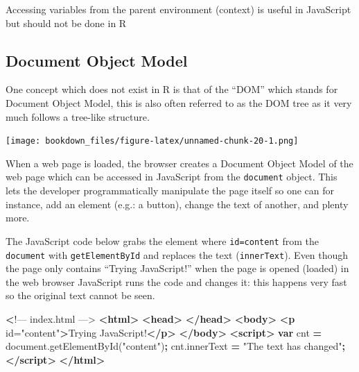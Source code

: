 \documentclass[
]{krantz}
\makeatletter
\newenvironment{Shaded}{\begin{snugshade}}{\end{snugshade}}
\newcommand{\AttributeTok}[1]{\textcolor[rgb]{0.61,0.61,0.61}{#1}}
\newcommand{\ErrorTok}[1]{\textcolor[rgb]{0.14,0.14,0.14}{\textbf{#1}}}
\newcommand{\KeywordTok}[1]{\textcolor[rgb]{0.27,0.27,0.27}{\textbf{#1}}}
\newcommand{\NormalTok}[1]{#1}
\newcommand{\OperatorTok}[1]{\textcolor[rgb]{0.43,0.43,0.43}{\textbf{#1}}}
\newcommand{\OtherTok}[1]{\textcolor[rgb]{0.37,0.37,0.37}{#1}}
\newcommand{\StringTok}[1]{\textcolor[rgb]{0.5,0.5,0.5}{#1}}
\newcommand{\VariableTok}[1]{\textcolor[rgb]{0,0,0}{#1}}
\newenvironment{kframe}{%
\medskip{}
\setlength{\fboxsep}{.8em}
 \def\at@end@of@kframe{}%
 \ifinner\ifhmode%
  \def\at@end@of@kframe{\end{minipage}}%
  \begin{minipage}{\columnwidth}%
 \fi\fi%
 \def\FrameCommand##1{\hskip\@totalleftmargin \hskip-\fboxsep
 \colorbox{shadecolor}{##1}\hskip-\fboxsep
     \hskip-\linewidth \hskip-\@totalleftmargin \hskip\columnwidth}%
 \MakeFramed {\advance\hsize-\width
   \@totalleftmargin\z@ \linewidth\hsize
   \@setminipage}}%
 {\par\unskip\endMakeFramed%
 \at@end@of@kframe}
\renewenvironment{Shaded}{\begin{kframe}}{\end{kframe}}
\newenvironment{rmdblock}[1]
  {
  \begin{itemize}
  \renewcommand{\labelitemi}{
    \raisebox{-.7\height}[0pt][0pt]{
      {\setkeys{Gin}{width=3em,keepaspectratio}\texttt{[image: images/\#1]}}
    }
  }
  \setlength{\fboxsep}{1em}
  \begin{kframe}
  \item
  }
  {
  \end{kframe}
  \end{itemize}
  }
\newenvironment{rmdnote}
  {\begin{rmdblock}{note}}
  {\end{rmdblock}}
\makeatother
\begin{document}
\begin{rmdnote}
Accessing variables from the parent environment (context) is useful in
JavaScript but should not be done in R
\end{rmdnote}

\hypertarget{basics-object-model}{%
\subsection{Document Object Model}\label{basics-object-model}}

One concept which does not exist in R is that of the ``DOM'' which stands for Document Object Model, this is also often referred to as the DOM tree as it very much follows a tree-like structure.

\texttt{[image: bookdown\_files/figure-latex/unnamed-chunk-20-1.png]}

When a web page is loaded, the browser creates a Document Object Model of the web page which can be accessed in JavaScript from the \texttt{document} object. This lets the developer programmatically manipulate the page itself so one can for instance, add an element (e.g.: a button), change the text of another, and plenty more.

The JavaScript code below grabs the element where \texttt{id=\textquotesingle{}content\textquotesingle{}} from the \texttt{document} with \texttt{getElementById} and replaces the text (\texttt{innerText}). Even though the page only contains ``Trying JavaScript!'' when the page is opened (loaded) in the web browser JavaScript runs the code and changes it: this happens very fast so the original text cannot be seen.

\begin{Shaded}
\begin{Highlighting}[]
 \ErrorTok{<}\NormalTok{!–– index.html ––>}
\KeywordTok{<html>}
  \KeywordTok{<head>}
  \KeywordTok{</head>}
  \KeywordTok{<body>}
    \KeywordTok{<p}\OtherTok{ id=}\StringTok{"content"}\KeywordTok{>}\NormalTok{Trying JavaScript!}\KeywordTok{</p>}
  \KeywordTok{</body>}
  \KeywordTok{<script>}
    \KeywordTok{var}\NormalTok{ cnt }\OperatorTok{=} \VariableTok{document}\NormalTok{.}\AttributeTok{getElementById}\NormalTok{(}\StringTok{"content"}\NormalTok{)}\OperatorTok{;}
    \VariableTok{cnt}\NormalTok{.}\AttributeTok{innerText} \OperatorTok{=} \StringTok{"The text has changed"}\OperatorTok{;}
  \KeywordTok{</script>}
\KeywordTok{</html>}
\end{Highlighting}
\end{Shaded}
\end{document}
